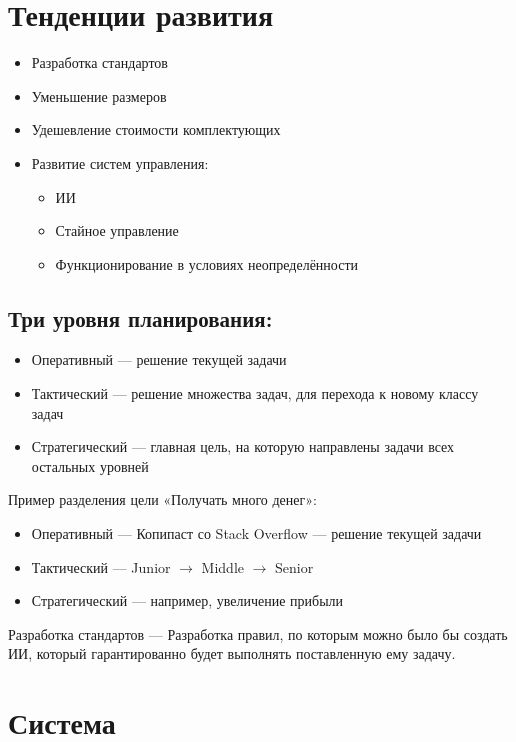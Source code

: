 \documentclass[12pt]{article}
\begin{document}
\begin{sloppypar}
    \section{Тенденции развития}
    \begin{itemize}
        \item Разработка стандартов
        \item Уменьшение размеров
        \item Удешевление стоимости комплектующих
        \item Развитие систем управления:
              \begin{itemize}
                  \item ИИ
                  \item Стайное управление
                  \item Функционирование в условиях неопределённости
              \end{itemize}
    \end{itemize}
    \subsection*{Три уровня планирования:}
    \begin{itemize}
        \item Оперативный — решение текущей задачи
        \item Тактический — решение множества задач, для перехода к новому классу задач
        \item Стратегический — главная цель, на которую направлены задачи всех
              остальных уровней
    \end{itemize}

    Пример разделения цели «Получать много денег»:
    \begin{itemize}
        \item Оперативный — Копипаст со Stack Overflow — решение текущей задачи
        \item Тактический — Junior $\rightarrow$ Middle $\rightarrow$ Senior
        \item Стратегический — например, увеличение прибыли
    \end{itemize}

    Разработка стандартов — Разработка правил, по которым можно было бы создать
    ИИ, который гарантированно будет выполнять поставленную ему задачу.

    \section{Система}


\end{sloppypar}
\end{document}
